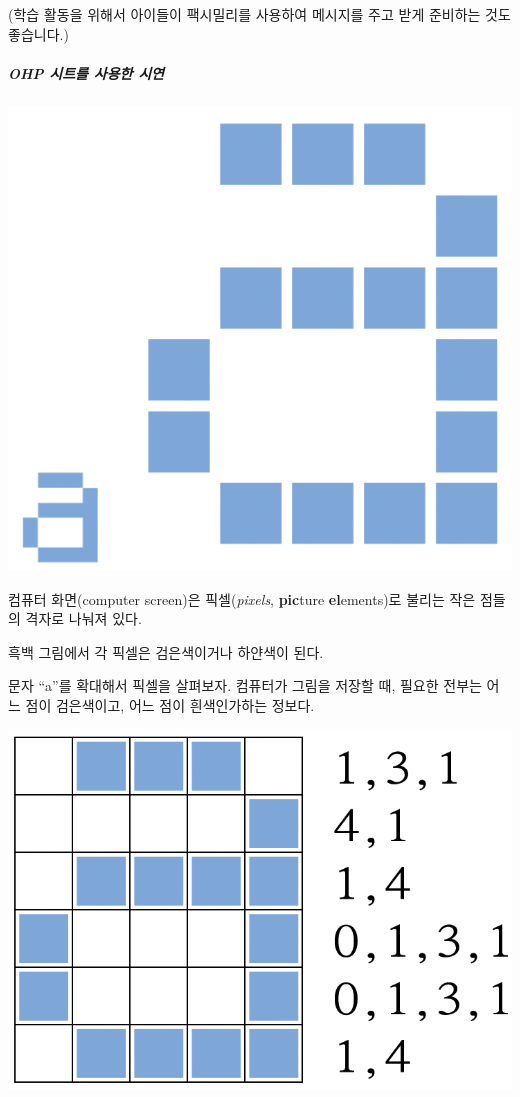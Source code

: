\documentclass[]{article}
\begin{document}
(학습 활동을 위해서 아이들이 팩시밀리를 사용하여 메시지를 주고 받게
준비하는 것도 좋습니다.)

\subparagraph{OHP 시트를 사용한 시연}\label{ohp---}

\includegraphics{csunplugged/01-part/img/ch02-img/02-image-01-a-01.png}

컴퓨터 화면(computer screen)은 픽셀(\emph{pixels}, \textbf{pic}ture
\textbf{el}ements)로 불리는 작은 점들의 격자로 나눠져 있다.

흑백 그림에서 각 픽셀은 검은색이거나 하얀색이 된다.

문자 ``a''를 확대해서 픽셀을 살펴보자. 컴퓨터가 그림을 저장할 때, 필요한
전부는 어느 점이 검은색이고, 어느 점이 흰색인가하는 정보다.

\includegraphics{csunplugged/01-part/img/ch02-img/02-image-01-a-02.png}
\end{document}
